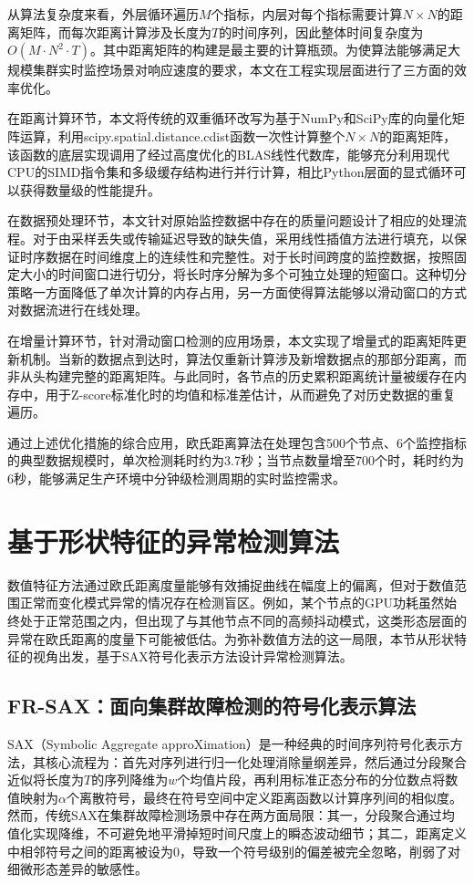 从算法复杂度来看，外层循环遍历$M$个指标，内层对每个指标需要计算$N \times N$的距离矩阵，而每次距离计算涉及长度为$T$的时间序列，因此整体时间复杂度为$O(M \cdot N^2 \cdot T)$。其中距离矩阵的构建是最主要的计算瓶颈。为使算法能够满足大规模集群实时监控场景对响应速度的要求，本文在工程实现层面进行了三方面的效率优化。

在距离计算环节，本文将传统的双重循环改写为基于NumPy和SciPy库的向量化矩阵运算，利用scipy.spatial.distance.cdist函数一次性计算整个$N \times N$的距离矩阵，该函数的底层实现调用了经过高度优化的BLAS线性代数库，能够充分利用现代CPU的SIMD指令集和多级缓存结构进行并行计算，相比Python层面的显式循环可以获得数量级的性能提升。

在数据预处理环节，本文针对原始监控数据中存在的质量问题设计了相应的处理流程。对于由采样丢失或传输延迟导致的缺失值，采用线性插值方法进行填充，以保证时序数据在时间维度上的连续性和完整性。对于长时间跨度的监控数据，按照固定大小的时间窗口进行切分，将长时序分解为多个可独立处理的短窗口。这种切分策略一方面降低了单次计算的内存占用，另一方面使得算法能够以滑动窗口的方式对数据流进行在线处理。

在增量计算环节，针对滑动窗口检测的应用场景，本文实现了增量式的距离矩阵更新机制。当新的数据点到达时，算法仅重新计算涉及新增数据点的那部分距离，而非从头构建完整的距离矩阵。与此同时，各节点的历史累积距离统计量被缓存在内存中，用于Z-score标准化时的均值和标准差估计，从而避免了对历史数据的重复遍历。

通过上述优化措施的综合应用，欧氏距离算法在处理包含500个节点、6个监控指标的典型数据规模时，单次检测耗时约为3.7秒；当节点数量增至700个时，耗时约为6秒，能够满足生产环境中分钟级检测周期的实时监控需求。

\section{基于形状特征的异常检测算法}

数值特征方法通过欧氏距离度量能够有效捕捉曲线在幅度上的偏离，但对于数值范围正常而变化模式异常的情况存在检测盲区。例如，某个节点的GPU功耗虽然始终处于正常范围之内，但出现了与其他节点不同的高频抖动模式，这类形态层面的异常在欧氏距离的度量下可能被低估。为弥补数值方法的这一局限，本节从形状特征的视角出发，基于SAX符号化表示方法设计异常检测算法。

\subsection{FR-SAX：面向集群故障检测的符号化表示算法}

SAX（Symbolic Aggregate approXimation）\cite{lin2007sax}是一种经典的时间序列符号化表示方法，其核心流程为：首先对序列进行归一化处理消除量纲差异，然后通过分段聚合近似将长度为$T$的序列降维为$w$个均值片段，再利用标准正态分布的分位数点将数值映射为$\alpha$个离散符号，最终在符号空间中定义距离函数以计算序列间的相似度。然而，传统SAX在集群故障检测场景中存在两方面局限：其一，分段聚合通过均值化实现降维，不可避免地平滑掉短时间尺度上的瞬态波动细节；其二，距离定义中相邻符号之间的距离被设为0，导致一个符号级别的偏差被完全忽略，削弱了对细微形态差异的敏感性。

